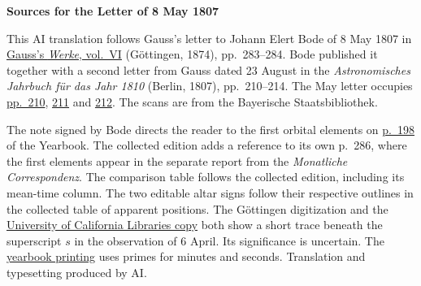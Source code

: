 \clearpage\thispagestyle{empty}
\begin{center}\textbf{Sources for the Letter of 8 May 1807}\end{center}
\noindent This AI translation follows Gauss’s letter to Johann Elert Bode of 8 May 1807 in \href{https://gdz.sub.uni-goettingen.de/id/PPN236007467}{Gauss’s \textit{Werke}, vol.~VI} (Göttingen, 1874), pp.~283--284. Bode published it together with a second letter from Gauss dated 23 August in the \textit{Astronomisches Jahrbuch für das Jahr 1810} (Berlin, 1807), pp.~210--214. The May letter occupies \href{https://www.digitale-sammlungen.de/en/view/bsb10538339?page=220}{pp.~210}, \href{https://www.digitale-sammlungen.de/en/view/bsb10538339?page=221}{211} and \href{https://www.digitale-sammlungen.de/en/view/bsb10538339?page=222}{212}. The scans are from the Bayerische Staatsbibliothek.
\par\medskip
The note signed by Bode directs the reader to the first orbital elements on \href{https://www.digitale-sammlungen.de/en/view/bsb10538339?page=208}{p.~198} of the Yearbook. The collected edition adds a reference to its own p.~286, where the first elements appear in the separate report from the \textit{Monatliche Correspondenz}. The comparison table follows the collected edition, including its mean-time column. The two editable altar signs follow their respective outlines in the collected table of apparent positions. The Göttingen digitization and the \href{https://archive.org/details/werkecarlf06gausrich}{University of California Libraries copy} both show a short trace beneath the superscript $s$ in the observation of 6 April. Its significance is uncertain. The \href{https://www.digitale-sammlungen.de/en/view/bsb10538437?page=218}{yearbook printing} uses primes for minutes and seconds. Translation and typesetting produced by AI.
\clearpage

